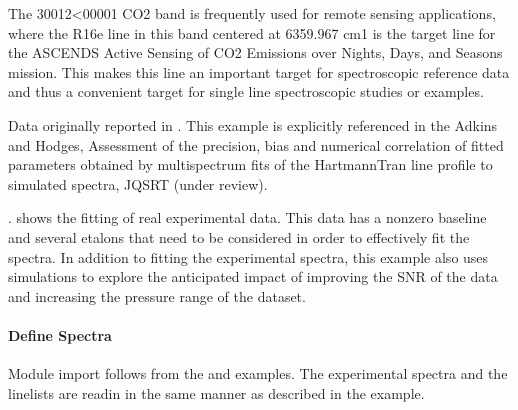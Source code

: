 \documentclass[letterpaper,10pt,english]{sphinxmanual}
\begin{document}
\sphinxAtStartPar
The 30012\textless{}\textendash{}00001 CO2 band is frequently used for remote sensing applications, where the R16e line in this band centered at 6359.967 cm\sphinxhyphen{}1 is the target line for the ASCENDS \sphinxhyphen{} Active Sensing of CO2 Emissions over Nights, Days, and Seasons mission.  This makes this line an important target for spectroscopic reference data and thus a convenient target for single line spectroscopic studies or examples.

\sphinxAtStartPar
Data originally reported in .  This example is explicitly referenced in the Adkins and Hodges, Assessment of the precision, bias and numerical correlation of fitted parameters obtained by multi\sphinxhyphen{}spectrum fits of the Hartmann\sphinxhyphen{}Tran line profile to simulated spectra, JQSRT (under review).

\sphinxAtStartPar
{}. shows the fitting of real experimental data.  This data has a non\sphinxhyphen{}zero baseline and several etalons that need to be considered in order to effectively fit the spectra.  In addition to fitting the experimental spectra, this example also uses simulations to explore the anticipated impact of improving the SNR of the data and increasing the pressure range of the dataset.


\paragraph{Define Spectra}
\label{\detokenize{Analysis of ASCENDS Line Spectra:define-spectra}}
\sphinxAtStartPar
Module import follows from the {\hyperref[\detokenize{Fitting Experimental Spectra:fitting-experimental-spectra}]{}} and {\hyperref[\detokenize{Fitting Synthetic Spectra:fitting-synthetic-spectra}]{}} examples.  The experimental spectra and the linelists are read\sphinxhyphen{}in in the same manner as described in the {\hyperref[\detokenize{Fitting Experimental Spectra:fitting-experimental-spectra}]{}} example.
\end{document}
